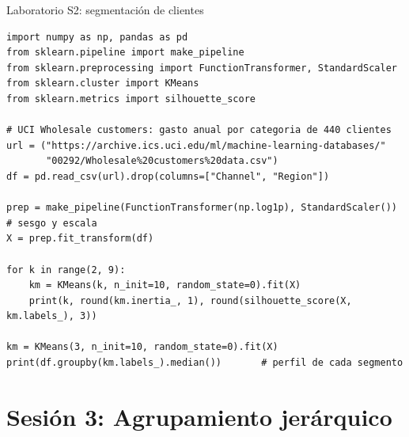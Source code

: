 \documentclass[aspectratio=169,11pt]{beamer}
\begin{document}
\begin{frame}[fragile]{Laboratorio S2: segmentación de clientes}
\begin{lstlisting}
import numpy as np, pandas as pd
from sklearn.pipeline import make_pipeline
from sklearn.preprocessing import FunctionTransformer, StandardScaler
from sklearn.cluster import KMeans
from sklearn.metrics import silhouette_score

# UCI Wholesale customers: gasto anual por categoria de 440 clientes
url = ("https://archive.ics.uci.edu/ml/machine-learning-databases/"
       "00292/Wholesale%20customers%20data.csv")
df = pd.read_csv(url).drop(columns=["Channel", "Region"])

prep = make_pipeline(FunctionTransformer(np.log1p), StandardScaler())  # sesgo y escala
X = prep.fit_transform(df)

for k in range(2, 9):
    km = KMeans(k, n_init=10, random_state=0).fit(X)
    print(k, round(km.inertia_, 1), round(silhouette_score(X, km.labels_), 3))

km = KMeans(3, n_init=10, random_state=0).fit(X)
print(df.groupby(km.labels_).median())       # perfil de cada segmento
\end{lstlisting}
\end{frame}

\section{Sesión 3: Agrupamiento jerárquico}
\end{document}
